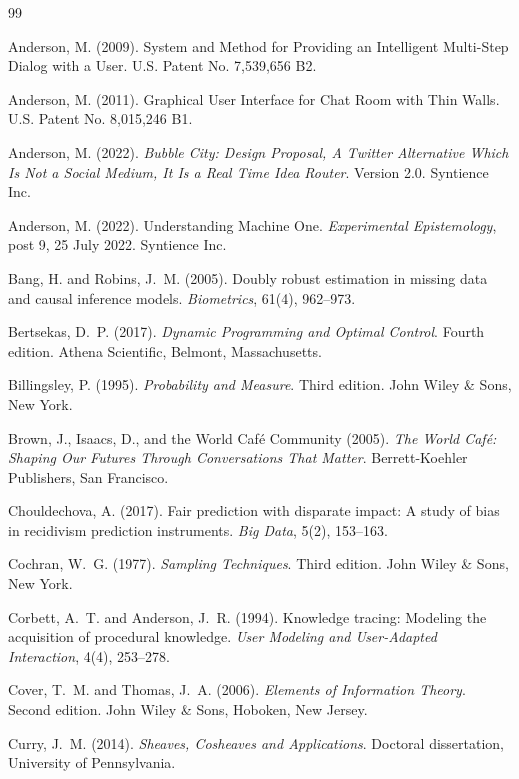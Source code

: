 \documentclass[11pt]{article}
\theoremstyle{definition}
\begin{document}
\begin{thebibliography}{99}

Anderson, M. (2009).
System and Method for Providing an Intelligent Multi-Step Dialog with a User.
U.S. Patent No. 7,539,656 B2.

Anderson, M. (2011).
Graphical User Interface for Chat Room with Thin Walls.
U.S. Patent No. 8,015,246 B1.

Anderson, M. (2022).
\textit{Bubble City: Design Proposal, A Twitter Alternative Which Is Not a Social Medium, It Is a Real Time Idea Router}.
Version 2.0.
Syntience Inc.

Anderson, M. (2022).
Understanding Machine One.
\textit{Experimental Epistemology}, post 9, 25 July 2022.
Syntience Inc.

Bang, H. and Robins, J.~M. (2005).
Doubly robust estimation in missing data and causal inference models.
\textit{Biometrics}, 61(4), 962--973.

Bertsekas, D.~P. (2017).
\textit{Dynamic Programming and Optimal Control}.
Fourth edition.
Athena Scientific, Belmont, Massachusetts.

Billingsley, P. (1995).
\textit{Probability and Measure}.
Third edition.
John Wiley \& Sons, New York.

Brown, J., Isaacs, D., and the World Caf\'e Community (2005).
\textit{The World Caf\'e: Shaping Our Futures Through Conversations That Matter}.
Berrett-Koehler Publishers, San Francisco.

Chouldechova, A. (2017).
Fair prediction with disparate impact: A study of bias in recidivism prediction instruments.
\textit{Big Data}, 5(2), 153--163.

Cochran, W.~G. (1977).
\textit{Sampling Techniques}.
Third edition.
John Wiley \& Sons, New York.

Corbett, A.~T. and Anderson, J.~R. (1994).
Knowledge tracing: Modeling the acquisition of procedural knowledge.
\textit{User Modeling and User-Adapted Interaction}, 4(4), 253--278.

Cover, T.~M. and Thomas, J.~A. (2006).
\textit{Elements of Information Theory}.
Second edition.
John Wiley \& Sons, Hoboken, New Jersey.

Curry, J.~M. (2014).
\textit{Sheaves, Cosheaves and Applications}.
Doctoral dissertation, University of Pennsylvania.


\end{thebibliography}
\end{document}
